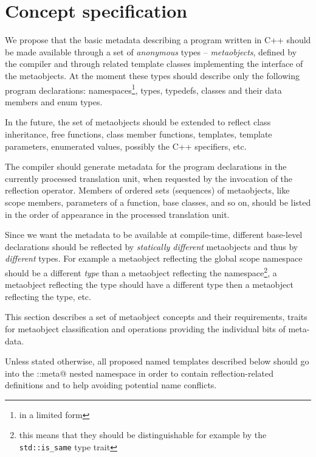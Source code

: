\section{Concept specification}
\label{section-current-Concepts}

We propose that the basic metadata describing a program written
in C++ should be made available through a set of {\em anonymous} types -- {\em metaobjects},
defined by the compiler and through related template classes implementing
the interface of the metaobjects.
At the moment these types should describe only the following program
declarations: namespaces\footnote{in a limited form}, types, typedefs,
classes and their data members and enum types.

In the future, the set of metaobjects should be extended to reflect
class inheritance, free functions, class member functions, templates,
template parameters, enumerated values, possibly the C++ specifiers, etc.

The compiler should generate metadata for the program declarations
in the currently processed translation unit, when requested by the invocation
of the reflection operator. Members of ordered sets (sequences) of metaobjects,
like scope members, parameters of a function, base classes, and so on, should be listed
in the order of appearance in the processed translation unit.

Since we want the metadata to be available at compile-time,
different base-level declarations should be reflected by
{\em statically different} metaobjects and thus by {\em different} types.
For example a metaobject reflecting the global scope namespace should
be a different {\em type} than a metaobject reflecting the \verb@std@
namespace\footnote{this means that they should be distinguishable for
example by the \texttt{std::is\_same} type trait},
a metaobject reflecting the \verb@int@ type should
have a different type then a metaobject reflecting the \verb@double@
type, etc.

This section describes a set of metaobject concepts
and their requirements, traits for metaobject classification and operations
providing the individual bits of meta-data.

Unless stated otherwise, all proposed named templates described below should
go into the \verb@std::meta@ nested namespace in order to contain reflection-related
definitions and to help avoiding potential name conflicts.

























